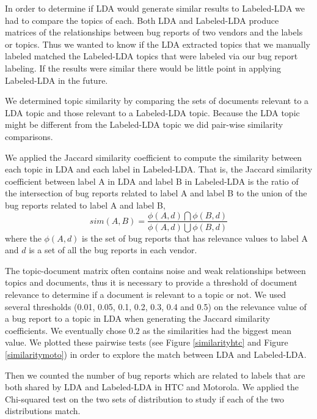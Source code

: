\documentclass[10pt, conference, compsocconf]{IEEEtran}
\begin{document}
In order to determine if LDA would generate similar results to
Labeled-LDA we had to compare the topics of each.
Both LDA and Labeled-LDA produce matrices of
 the relationships between bug reports of two vendors and the
labels or topics.
Thus we wanted to know if the LDA extracted topics that we manually
labeled matched the Labeled-LDA topics that were labeled via our bug
report labeling. If the results were similar there would be little
point in applying Labeled-LDA in the future.

We determined topic similarity by comparing the sets of documents
relevant to a LDA topic and those relevant to a Labeled-LDA
topic. Because the LDA topic might be different from the Labeled-LDA
topic we did pair-wise similarity comparisons.

We applied the Jaccard similarity coefficient to compute the
similarity between each topic in LDA and each label in Labeled-LDA. 
That is, the Jaccard similarity coefficient between label A in LDA and
label B in Labeled-LDA is the ratio of the intersection of bug reports
related to label A and label B to the union of the bug reports related
to label A and label B,
\begin{equation}
sim(A,B) = \frac{\phi(A,d)\bigcap\phi(B,d)}{\phi(A,d)\bigcup\phi(B,d)}
\end{equation}
where the $\phi(A,d)$ is the set of bug reports that has relevance
values to label A and $d$ is a set of all the bug reports in each
vendor.

The topic-document matrix often contains noise and weak
relationships between topics and documents, thus it is necessary to
provide a threshold of document relevance to determine if a document
is relevant to a topic or not.
We used several thresholds (0.01, 0.05, 0.1, 0.2, 0.3, 0.4 and 0.5) on
the relevance value of a bug report to a topic in LDA when generating
the Jaccard similarity coefficients. 
We eventually chose $0.2$ as the similarities had the biggest mean
value. 
We plotted these pairwise tests (see Figure \ref{similarityhtc} and
Figure \ref{similaritymoto}) in order to explore the match between
LDA and Labeled-LDA.

Then we counted the number of bug reports which are related to labels
that are both shared by LDA and Labeled-LDA in HTC and Motorola. 
We applied the Chi-squared test on the two sets of distribution to
study if each of the two distributions match.
\end{document}
